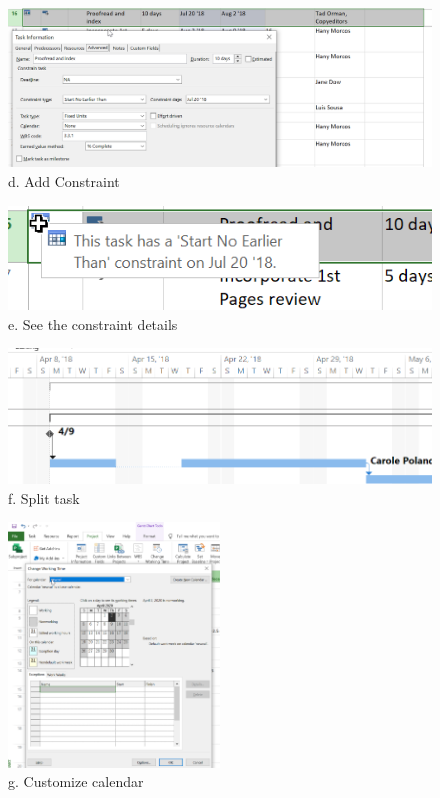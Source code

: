 \documentclass[runningheads]{llncs}
\begin{document}
\begin{figure}[H]
    \centering
    \includegraphics[width=1.0\textwidth]{image/fd}
    \caption{d. Add Constraint}
\end{figure}

\begin{figure}[H]
    \centering
    \includegraphics[width=1.0\textwidth]{image/fe}
    \caption{e. See the constraint details}
\end{figure}

\begin{figure}[H]
    \centering
    \includegraphics[width=1.0\textwidth]{image/ff}
    \caption{f. Split task}
\end{figure}

\begin{figure}[H]
    \centering
    \includegraphics[width=0.5\textwidth]{image/fg}
    \caption{g. Customize calendar}
\end{figure}
\end{document}
